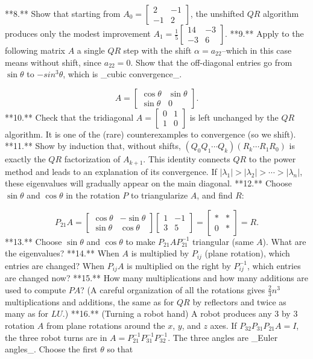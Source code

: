 

**8.** Show that starting from \(A_{0}=\left[\begin{smallmatrix}2&-1\\ -1&2\end{smallmatrix}\right]\), the unshifted \(QR\) algorithm produces only the modest improvement \(A_{1}=\frac{1}{5}\left[\begin{smallmatrix}14&-3\\ -3&6\end{smallmatrix}\right]\).
**9.** Apply to the following matrix \(A\) a single \(QR\) step with the shift \(\alpha=a_{22}\)--which in this case means without shift, since \(a_{22}=0\). Show that the off-diagonal entries go from \(\sin\theta\) to \(-sin^{3}\theta\), which is _cubic convergence_.

\[A=\begin{bmatrix}\cos\theta&\sin\theta\\ \sin\theta&0\end{bmatrix}.\]
**10.** Check that the tridiagonal \(A=\left[\begin{smallmatrix}0&1\\ 1&0\end{smallmatrix}\right]\) is left unchanged by the \(QR\) algorithm. It is one of the (rare) counterexamples to convergence (so we shift).
**11.** Show by induction that, without shifts, \((Q_{0}Q_{1}\cdots Q_{k})(R_{k}\cdots R_{1}R_{0})\) is exactly the \(QR\) factorization of \(A_{k+1}\). This identity connects \(QR\) to the power method and leads to an explanation of its convergence. If \(|\lambda_{1}|>|\lambda_{2}|>\cdots>|\lambda_{n}|\), these eigenvalues will gradually appear on the main diagonal.
**12.** Choose \(\sin\theta\) and \(\cos\theta\) in the rotation \(P\) to triangularize \(A\), and find \(R\):

\[P_{21}A=\begin{bmatrix}\cos\theta&-\sin\theta\\ \sin\theta&\cos\theta\end{bmatrix}\begin{bmatrix}1&-1\\ 3&5\end{bmatrix}=\begin{bmatrix}*&*\\ 0&*\end{bmatrix}=R.\]
**13.** Choose \(\sin\theta\) and \(\cos\theta\) to make \(P_{21}AP_{21}^{-1}\) triangular (same \(A\)). What are the eigenvalues?
**14.** When \(A\) is multiplied by \(P_{ij}\) (plane rotation), which entries are changed? When \(P_{ij}A\) is multiplied on the right by \(P_{ij}^{-1}\), which entries are changed now?
**15.** How many multiplications and how many additions are used to compute \(PA\)? (A careful organization of all the rotations gives \(\frac{2}{3}n^{3}\) multiplications and additions, the same as for \(QR\) by reflectors and twice as many as for \(LU\).)
**16.** (Turning a robot hand) A robot produces any 3 by 3 rotation \(A\) from plane rotations around the \(x\), \(y\), and \(z\) axes. If \(P_{32}P_{31}P_{21}A=I\), the three robot turns are in \(A=P_{21}^{-1}P_{31}^{-1}P_{32}^{-1}\). The three angles are _Euler angles_. Choose the first \(\theta\) so that

